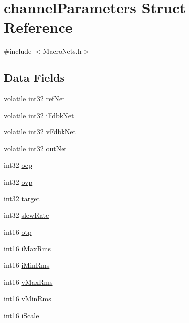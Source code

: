 \hypertarget{structchannel_parameters}{\section{channel\-Parameters Struct Reference}
\label{structchannel_parameters}
}


{\ttfamily \#include $<$Macro\-Nets.\-h$>$}

\subsection*{Data Fields}
\begin{DoxyCompactItemize}
\item 
volatile int32 \hyperlink{structchannel_parameters_a8e3dbb10da7b72b7b4fe6c200fbb495c}{ref\-Net}
\item 
volatile int32 \hyperlink{structchannel_parameters_ad4f53b220d97af172b01f1a6d57a9635}{i\-Fdbk\-Net}
\item 
volatile int32 \hyperlink{structchannel_parameters_a5b3f0afc0e3ef0bc0726ee695570e787}{v\-Fdbk\-Net}
\item 
volatile int32 \hyperlink{structchannel_parameters_ae9a6e93b8f7d8554dd06269339167215}{out\-Net}
\item 
int32 \hyperlink{structchannel_parameters_a95bd86963045f10f75c656956a09858c}{ocp}
\item 
int32 \hyperlink{structchannel_parameters_aefb9a7e765e361d08e0ae0bbc352e244}{ovp}
\item 
int32 \hyperlink{structchannel_parameters_a2d9b0f07810affea40c8502613b8984e}{target}
\item 
int32 \hyperlink{structchannel_parameters_a09eb121ecb75a652f7689869d1685a30}{slew\-Rate}
\item 
int16 \hyperlink{structchannel_parameters_a9df39dee6c165c882bb04e26b17e3e25}{otp}
\item 
int16 \hyperlink{structchannel_parameters_ab4b8dda9d3ab4395a3fde8bc0e403212}{i\-Max\-Rms}
\item 
int16 \hyperlink{structchannel_parameters_a12f6946f5b0ee1235d7edcb6a22a4518}{i\-Min\-Rms}
\item 
int16 \hyperlink{structchannel_parameters_a21e56dc9f903bbea9c980648a8ffc097}{v\-Max\-Rms}
\item 
int16 \hyperlink{structchannel_parameters_af6a4d30899a436a77b24b99baa2852f6}{v\-Min\-Rms}
\item 
int16 \hyperlink{structchannel_parameters_a022031c9e8a34b37c6cd05d8d7934a13}{i\-Scale}

\end{DoxyCompactItemize}
